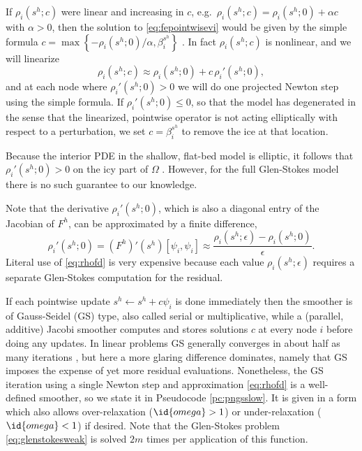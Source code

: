 \documentclass[letterpaper,final,12pt,reqno]{amsart}
\theoremstyle{claim}
\newcommand{\eps}{\epsilon}
\numberwithin{equation}{section}
\numberwithin{figure}{section}
\numberwithin{table}{section}
\numberwithin{theorem}{section}
\begin{document}
If $\rho_i(s^h; c)$ were linear and increasing in $c$, e.g.~$\rho_i(s^h; c) = \rho_i(s^h; 0) + \alpha c$ with $\alpha > 0$, then the solution to \eqref{eq:fepointwisevi} would be given by the simple formula $c = \max\left\{-\rho_i(s^h; 0)/\alpha, \beta_i^{s^h}\right\}$ \cite{GraeserKornhuber2009}.  In fact $\rho_i(s^h; c)$ is nonlinear, and we will linearize
\begin{equation}
\rho_i(s^h; c) \approx \rho_i(s^h; 0) + c\, \rho_i'(s^h; 0), \label{eq:rhoapprox}
\end{equation}
and at each node where $\rho_i'(s^h; 0) > 0$ we will do one projected Newton step using the simple formula.  If $\rho_i'(s^h; 0) \le 0$, so that the model has degenerated in the sense that the linearized, pointwise operator is not acting elliptically with respect to a perturbation, we set $c = \beta_i^{s^h}$ to remove the ice at that location.  %

Because the interior PDE in the shallow, flat-bed model is elliptic, it follows that $\rho_i'(s^h; 0) > 0$ on the icy part of $\Omega$ \cite{JouvetBueler2012}.  However, for the full Glen-Stokes model there is no such guarantee to our knowledge.

Note that the derivative $\rho_i'(s^h; 0)$, which is also a diagonal entry of the Jacobian of $F^h$, can be approximated by a finite difference,
\begin{equation}
\rho_i'(s^h; 0) = (F^h)'(s^h)[\psi_i,\psi_i] \approx \frac{\rho_i(s^h; \eps) - \rho_i(s^h; 0)}{\eps}.  \label{eq:rhofd}
\end{equation}
Literal use of \eqref{eq:rhofd} is very expensive because each value $\rho_i(s^h; \eps)$ requires a separate Glen-Stokes computation for the residual.

If each pointwise update $s^h \gets s^h + c \psi_i$ is done immediately then the smoother is of Gauss-Seidel (GS) type, also called serial or multiplicative, while a (parallel, additive) Jacobi smoother computes and stores solutions $c$ at every node $i$ before doing any updates.  In linear problems GS generally converges in about half as many iterations \cite{Greenbaum1997}, but here a more glaring difference dominates, namely that GS imposes the expense of yet more residual evaluations.  Nonetheless, the GS iteration using a single Newton step and approximation \eqref{eq:rhofd} is a well-defined smoother, so we state it in Pseudocode \ref{pc:pngsslow}.  It is given in a form which also allows over-relaxation ($\id{omega} > 1$) or under-relaxation ($\id{omega} < 1$) if desired.  Note that the Glen-Stokes problem \eqref{eq:glenstokesweak} is solved $2m$ times per application of this function.
\end{document}
